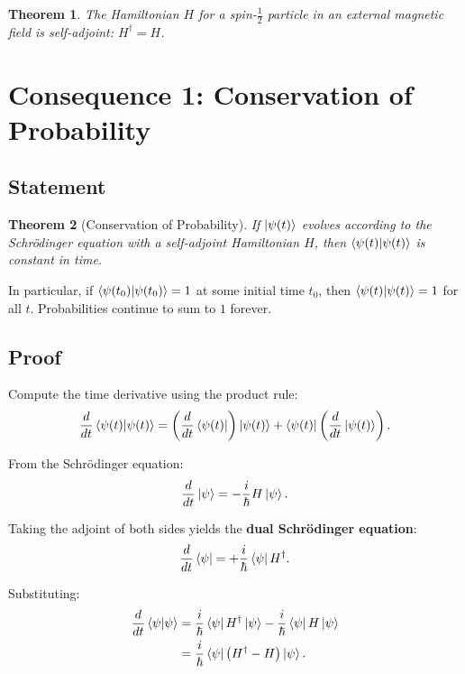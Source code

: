 \documentclass[11pt,a4paper]{article}
\theoremstyle{definition}
\theoremstyle{plain}
\newtheorem{theorem}{Theorem}[section]
\theoremstyle{remark}
\begin{document}
\begin{theorem}
    The Hamiltonian $H$ for a spin-$\frac{1}{2}$ particle in an external magnetic field is self-adjoint: $H^\dagger = H$.
\end{theorem}

\section{Consequence 1: Conservation of Probability}

\subsection{Statement}

\begin{theorem}[Conservation of Probability]
    If $\ket{\psi(t)}$ evolves according to the Schr\"odinger equation with a self-adjoint Hamiltonian $H$, then $\braket{\psi(t)}{\psi(t)}$ is constant in time.
\end{theorem}

In particular, if $\braket{\psi(t_0)}{\psi(t_0)} = 1$ at some initial time $t_0$, then $\braket{\psi(t)}{\psi(t)} = 1$ for all $t$. Probabilities continue to sum to $1$ forever.

\subsection{Proof}

Compute the time derivative using the product rule:
\[
    \frac{d}{dt}\braket{\psi(t)}{\psi(t)} = \left(\frac{d}{dt}\bra{\psi(t)}\right)\ket{\psi(t)} + \bra{\psi(t)}\left(\frac{d}{dt}\ket{\psi(t)}\right).
\]

From the Schr\"odinger equation:
\[
    \frac{d}{dt}\ket{\psi} = -\frac{i}{\hbar}H\ket{\psi}.
\]

Taking the adjoint of both sides yields the \textbf{dual Schr\"odinger equation}:
\[
    \frac{d}{dt}\bra{\psi} = +\frac{i}{\hbar}\bra{\psi}H^\dagger.
\]

Substituting:
\begin{align}
    \frac{d}{dt}\braket{\psi}{\psi} &= \frac{i}{\hbar}\bra{\psi}H^\dagger\ket{\psi} - \frac{i}{\hbar}\bra{\psi}H\ket{\psi} \\
    &= \frac{i}{\hbar}\bra{\psi}\bigl(H^\dagger - H\bigr)\ket{\psi}.
\end{align}
\end{document}
